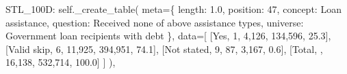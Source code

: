 \documentclass[
  11pt,
  a4paper,
]{article}
\newenvironment{Shaded}{\begin{snugshade}}{\end{snugshade}}
\newcommand{\NormalTok}[1]{\textcolor[rgb]{0.00,0.23,0.31}{#1}}
\newcommand{\OperatorTok}[1]{\textcolor[rgb]{0.37,0.37,0.37}{#1}}
\newcommand{\StringTok}[1]{\textcolor[rgb]{0.13,0.47,0.30}{#1}}
\newcommand{\VariableTok}[1]{\textcolor[rgb]{0.07,0.07,0.07}{#1}}
\begin{document}
\begin{Shaded}
\begin{Highlighting}[]
            \StringTok{\textquotesingle{}STL\_100D\textquotesingle{}}\NormalTok{: }\VariableTok{self}\NormalTok{.\_create\_table(}
\NormalTok{                meta}\OperatorTok{=}\NormalTok{\{}
                \StringTok{\textquotesingle{}length\textquotesingle{}}\NormalTok{: }\StringTok{\textquotesingle{}1.0\textquotesingle{}}\NormalTok{, }\StringTok{\textquotesingle{}position\textquotesingle{}}\NormalTok{: }\StringTok{\textquotesingle{}47\textquotesingle{}}\NormalTok{,}
                \StringTok{\textquotesingle{}concept\textquotesingle{}}\NormalTok{: }\StringTok{\textquotesingle{}Loan assistance\textquotesingle{}}\NormalTok{,}
                \StringTok{\textquotesingle{}question\textquotesingle{}}\NormalTok{: }\StringTok{\textquotesingle{}Received none of above assistance types\textquotesingle{}}\NormalTok{,}
                \StringTok{\textquotesingle{}universe\textquotesingle{}}\NormalTok{: }\StringTok{\textquotesingle{}Government loan recipients with debt\textquotesingle{}}
\NormalTok{                \},}
\NormalTok{                data}\OperatorTok{=}\NormalTok{[}
\NormalTok{                [}\StringTok{\textquotesingle{}Yes\textquotesingle{}}\NormalTok{, }\StringTok{\textquotesingle{}1\textquotesingle{}}\NormalTok{, }\StringTok{\textquotesingle{}4,126\textquotesingle{}}\NormalTok{, }\StringTok{\textquotesingle{}134,596\textquotesingle{}}\NormalTok{, }\StringTok{\textquotesingle{}25.3\textquotesingle{}}\NormalTok{],}
\NormalTok{                [}\StringTok{\textquotesingle{}Valid skip\textquotesingle{}}\NormalTok{, }\StringTok{\textquotesingle{}6\textquotesingle{}}\NormalTok{, }\StringTok{\textquotesingle{}11,925\textquotesingle{}}\NormalTok{, }\StringTok{\textquotesingle{}394,951\textquotesingle{}}\NormalTok{, }\StringTok{\textquotesingle{}74.1\textquotesingle{}}\NormalTok{],}
\NormalTok{                [}\StringTok{\textquotesingle{}Not stated\textquotesingle{}}\NormalTok{, }\StringTok{\textquotesingle{}9\textquotesingle{}}\NormalTok{, }\StringTok{\textquotesingle{}87\textquotesingle{}}\NormalTok{, }\StringTok{\textquotesingle{}3,167\textquotesingle{}}\NormalTok{, }\StringTok{\textquotesingle{}0.6\textquotesingle{}}\NormalTok{],}
\NormalTok{                [}\StringTok{\textquotesingle{}Total\textquotesingle{}}\NormalTok{, }\StringTok{\textquotesingle{}\textquotesingle{}}\NormalTok{, }\StringTok{\textquotesingle{}16,138\textquotesingle{}}\NormalTok{, }\StringTok{\textquotesingle{}532,714\textquotesingle{}}\NormalTok{, }\StringTok{\textquotesingle{}100.0\textquotesingle{}}\NormalTok{]}
\NormalTok{                ]}
\NormalTok{            ),}
        

\end{Highlighting}
\end{Shaded}
\end{document}
